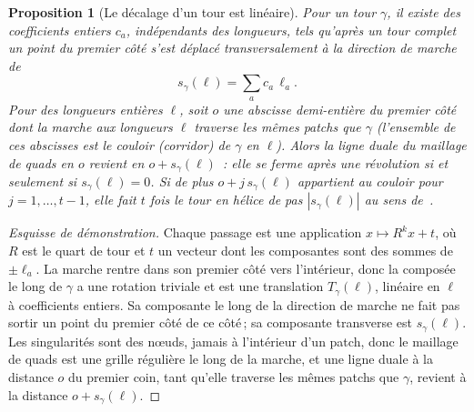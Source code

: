 \documentclass[11pt,a4paper]{article}
\newtheorem{proposition}{Proposition}
\newcommand{\shift}{s}
\newcommand{\lean}[1]{\texttt{\detokenize{#1}}}
\newenvironment{evidence}[3][]{}{}
\begin{document}
\begin{evidence}{core}{\lean{TMesh.Turn.shift_linear}, \lean{TMesh.Turn.mem_corridor_iff}, \lean{TMesh.Turn.comes_back}, \lean{TMesh.Turn.winds}\,; exemples~: \lean{TMesh.twistedTorus.walk_turn}\,; supposé~: un recollement orienté\,; le corridor sans demi-entier n'est pas formalisé}
\begin{proposition}[Le décalage d'un tour est linéaire]\label{prop:linear}
Pour un tour $\gamma$, il existe des coefficients entiers $c_a$,
indépendants des longueurs, tels qu'après un tour complet un point du
premier côté s'est déplacé transversalement à la direction de marche de
\[
  \shift_\gamma(\ell) = \sum_a c_a\, \ell_a .
\]
Pour des longueurs entières $\ell$, soit $o$ une abscisse demi-entière du
premier côté dont la marche aux longueurs $\ell$ traverse les mêmes patchs
que $\gamma$ (l'ensemble de ces abscisses est le \emph{couloir}
(\emph{corridor}) de $\gamma$ en $\ell$). Alors la ligne duale du maillage
de quads en $o$ revient en $o + \shift_\gamma(\ell)$~: elle se ferme après
une révolution si et seulement si $\shift_\gamma(\ell) = 0$. Si de plus $o +
j\,\shift_\gamma(\ell)$ appartient au couloir pour $j = 1, \dots, t - 1$,
elle fait $t$ fois le tour en hélice de pas $|\shift_\gamma(\ell)|$ au sens
de~\cite{bommes2011structure}.
\end{proposition}
\end{evidence}

\begin{proof}[Esquisse de démonstration]
Chaque passage est une application $x \mapsto R^k x + t$, où $R$ est le
quart de tour et $t$ un vecteur dont les composantes sont des sommes de
$\pm\ell_a$. La marche rentre dans son premier côté vers l'intérieur, donc la
composée le long de $\gamma$ a une rotation triviale et est une translation
$T_\gamma(\ell)$, linéaire en $\ell$ à coefficients entiers. Sa composante
le long de la direction de marche ne fait pas sortir un point du premier
côté de ce côté\,; sa composante transverse est $\shift_\gamma(\ell)$. Les
singularités sont des nœuds, jamais à l'intérieur d'un patch, donc le
maillage de quads est une grille régulière le long de la marche, et une
ligne duale à la distance $o$ du premier coin, tant qu'elle traverse les
mêmes patchs que $\gamma$, revient à la distance $o + \shift_\gamma(\ell)$.
\end{proof}
\end{document}
